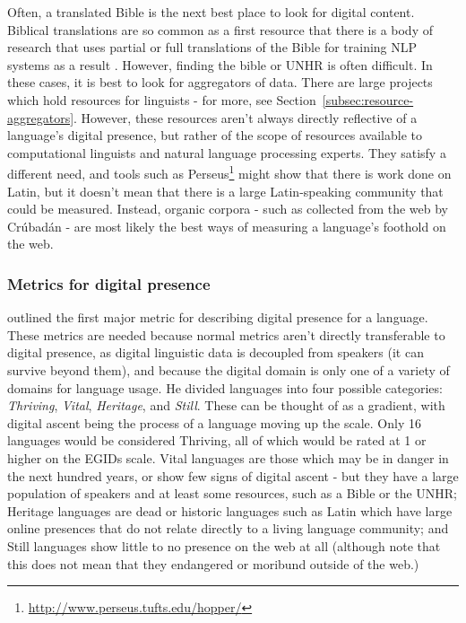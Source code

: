 Often, a translated Bible is the next best place to look for digital content. Biblical translations are so common as a first resource that there is a body of research that uses partial or full translations of the Bible for training NLP systems as a result \citep{chew2006evaluation, agic2015if}. However, finding the bible or UNHR is often difficult. In these cases, it is best to look for aggregators of data. There are large projects which hold resources for linguists - for more, see Section~\ref{subsec:resource-aggregators}. However, these resources aren't always directly reflective of a language's digital presence, but rather of the scope of resources available to computational linguists and natural language processing experts. They satisfy a different need, and tools such as Perseus\footnote{\href{http://www.perseus.tufts.edu/hopper/}{http://www.perseus.tufts.edu/hopper/}} might show that there is work done on Latin, but it doesn't mean that there is a large Latin-speaking community that could be measured. Instead, organic corpora - such as collected from the web by Cr\'ubad\'an - are most likely the best ways of measuring a language's foothold on the web.

\subsubsection{Metrics for digital presence}

\citet{kornai2013digital} outlined the first major metric for describing digital presence for a language. These metrics are needed because normal metrics aren't directly transferable to digital presence, as digital linguistic data is decoupled from speakers (it can survive beyond them), and because the digital domain is only one of a variety of domains for language usage. He divided languages into four possible categories: {\it Thriving}, {\it Vital}, {\it Heritage}, and {\it Still}. These can be thought of as a gradient, with digital ascent being the process of a language moving up the scale. Only 16 languages would be considered Thriving, all of which would be rated at 1 or higher on the EGIDs scale. Vital languages are those which may be in danger in the next hundred years, or show few signs of digital ascent - but they have a large population of speakers and at least some resources, such as a Bible or the UNHR; Heritage languages are dead or historic languages such as Latin which have large online presences that do not relate directly to a living language community; and Still languages show little to no presence on the web at all (although note that this does not mean that they endangered or moribund outside of the web.)


